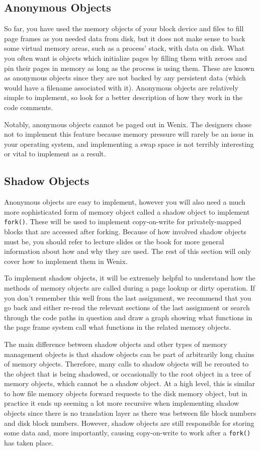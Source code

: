 \subsection{Anonymous Objects} \label{anon}

So far, you have used the memory objects of your block device and files to fill page frames as you needed data from disk, but it does not make sense to back some virtual memory areas, such as a process' stack, with data on disk. What you often want is objects which initialize pages by filling them with zeroes and pin their pages in memory as long as the process is using them. These are known as anonymous objects since they are not backed by any persistent data (which would have a filename associated with it). Anonymous objects are relatively simple to implement, so look for a better description of how they work in the code comments.

Notably, anonymous objects cannot be paged out in Wenix. The designers chose not to implement this feature because memory pressure will rarely be an issue in your operating system, and implementing a swap space is not terribly interesting or vital to implement as a result.

\subsection{Shadow Objects}

Anonymous objects are easy to implement, however you will also need a much more sophisticated form of memory object called a shadow object to implement \texttt{fork()}. These will be used to implement copy-on-write for privately-mapped blocks that are accessed after forking. Because of how involved shadow objects must be, you should refer to lecture slides or the book for more general information about how and why they are used. The rest of this section will only cover how to implement them in Wenix.

To implement shadow objects, it will be extremely helpful to understand how the methods of memory objects are called during a page lookup or dirty operation. If you don't remember this well from the last assignment, we recommend that you go back and either re-read the relevant sections of the last assignment or search through the code paths in question and draw a graph showing what functions in the page frame system call what functions in the related memory objects.

The main difference between shadow objects and other types of memory management objects is that shadow objects can be part of arbitrarily long chains of memory objects. Therefore, many calls to shadow objects will be rerouted to the object that is being shadowed, or occasionally to the root object in a tree of memory objects, which cannot be a shadow object. At a high level, this is similar to how file memory objects forward requests to the disk memory object, but in practice it ends up seeming a lot more recursive when implementing shadow objects since there is no translation layer as there was between file block numbers and disk block numbers. However, shadow objects are still responsible for storing some data and, more importantly, causing copy-on-write to work after a \texttt{fork()} has taken place.

